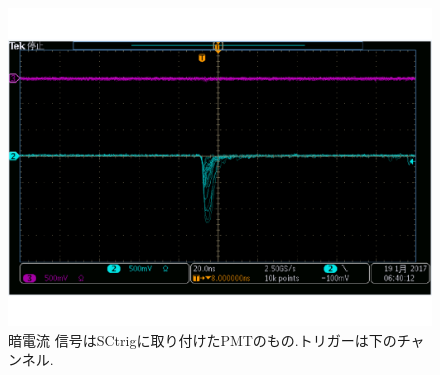 \begin{figure}[H]
\centering
\includegraphics[keepaspectratio,scale=0.3]{fig/ybm/oscillo2.pdf}
\caption{暗電流\newline
信号はSCtrigに取り付けたPMTのもの.トリガーは下のチャンネル.}
\label{fig:oscilloH2}
\end{figure}

